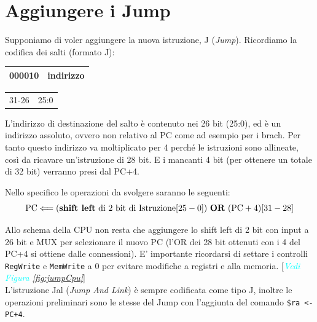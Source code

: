 \section{Aggiungere i Jump}
Supponiamo di voler aggiungere la nuova istruzione, J (\textit{Jump}). Ricordiamo la codifica dei salti (formato J):
\begin{table}[H]
    \centering
    \begin{tabular}{|c|c|}
         \hline \hspace{.5cm}000010\hspace{.5cm} & \hspace{2cm}indirizzo\hspace{2cm}\phantom{}\\\hline
    \end{tabular}
    \begin{tabular}{cc}
         \hspace{.1cm}31-26\hspace{.8cm} & \hspace{2.2cm}25:0\hspace{2cm}\phantom{}\\
    \end{tabular}
\end{table}

L'indirizzo di destinazione del salto è contenuto nei 26 bit (25:0), ed è un indirizzo assoluto, ovvero non relativo al PC come ad esempio per i brach. Per tanto questo indirizzo va moltiplicato per 4 perché le istruzioni sono allineate, così da ricavare un'istruzione di 28 bit. E i mancanti 4 bit (per ottenere un totale di 32 bit) verranno presi dal PC+4.

Nello specifico le operazioni da svolgere saranno le seguenti:
\begin{equation*}
    \text{PC} \Longleftarrow (\text{\textbf{shift left} di 2 bit di Istruzione}[25-0]) \text{ \textbf{OR} } (\text{PC}+4)[31-28]
\end{equation*}

Allo schema della CPU non resta che aggiungere lo shift left di 2 bit con input a 26 bit e MUX per selezionare il nuovo PC (l'OR dei 28 bit ottenuti con i 4 del PC+4 si ottiene dalle connessioni). E' importante ricordarsi di settare i controlli \verb|RegWrite| e \verb|MemWrite| a 0 per evitare modifiche a registri e alla memoria. [\textit{\textcolor{cyan}{Vedi Figura \ref{fig:jumpCpu}}}]\\

L'istruzione Jal (\textit{Jump And Link}) è sempre codificata come tipo J, inoltre le operazioni preliminari sono le stesse del Jump con l'aggiunta del comando \verb|$ra <- PC+4|. 

